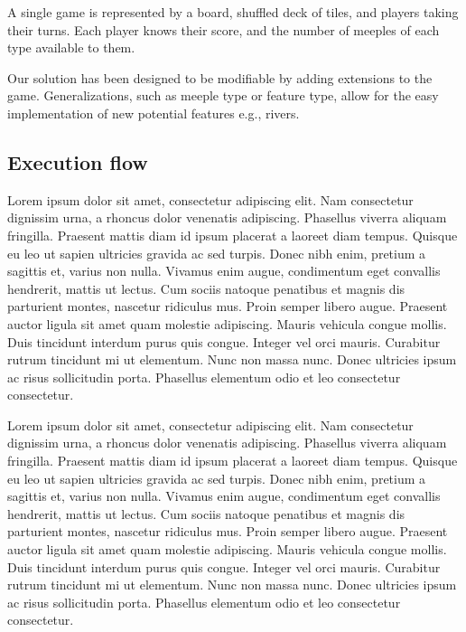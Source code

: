 A single game is represented by a board, shuffled deck of tiles, and players taking their turns. Each player knows their score, and the number of meeples of each type available to them.

Our solution has been designed to be modifiable by adding extensions to the game. Generalizations, such as meeple type or feature type, allow for the easy implementation of new potential features e.g., rivers.

\subsection{Execution flow}
Lorem ipsum dolor sit amet, consectetur adipiscing elit. Nam consectetur dignissim urna, a rhoncus dolor venenatis adipiscing. Phasellus viverra aliquam fringilla. Praesent mattis diam id ipsum placerat a laoreet diam tempus. Quisque eu leo ut sapien ultricies gravida ac sed turpis. Donec nibh enim, pretium a sagittis et, varius non nulla. Vivamus enim augue, condimentum eget convallis hendrerit, mattis ut lectus. Cum sociis natoque penatibus et magnis dis parturient montes, nascetur ridiculus mus. Proin semper libero augue. Praesent auctor ligula sit amet quam molestie adipiscing. Mauris vehicula congue mollis. Duis tincidunt interdum purus quis congue. Integer vel orci mauris. Curabitur rutrum tincidunt mi ut elementum. Nunc non massa nunc. Donec ultricies ipsum ac risus sollicitudin porta. Phasellus elementum odio et leo consectetur consectetur. 

Lorem ipsum dolor sit amet, consectetur adipiscing elit. Nam consectetur dignissim urna, a rhoncus dolor venenatis adipiscing. Phasellus viverra aliquam fringilla. Praesent mattis diam id ipsum placerat a laoreet diam tempus. Quisque eu leo ut sapien ultricies gravida ac sed turpis. Donec nibh enim, pretium a sagittis et, varius non nulla. Vivamus enim augue, condimentum eget convallis hendrerit, mattis ut lectus. Cum sociis natoque penatibus et magnis dis parturient montes, nascetur ridiculus mus. Proin semper libero augue. Praesent auctor ligula sit amet quam molestie adipiscing. Mauris vehicula congue mollis. Duis tincidunt interdum purus quis congue. Integer vel orci mauris. Curabitur rutrum tincidunt mi ut elementum. Nunc non massa nunc. Donec ultricies ipsum ac risus sollicitudin porta. Phasellus elementum odio et leo consectetur consectetur. 

